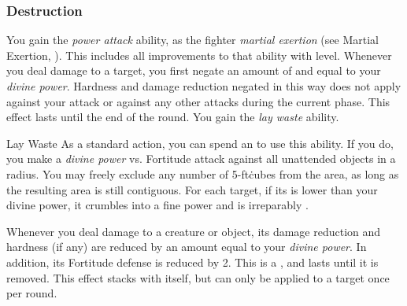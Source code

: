         \subsubsection{Destruction}
             You gain the \textit{power attack} ability, as the fighter \textit{martial exertion} (see Martial Exertion, ).
            This includes all improvements to that ability with level.
             Whenever you deal damage to a target, you first negate an amount of  and  equal to your \textit{divine power}.
            Hardness and damage reduction negated in this way does not apply against your attack or against any other attacks during the current phase.
            This effect lasts until the end of the round.
             You gain the \textit{lay waste} ability.
            \begin{ability}{Lay Waste}
                As a standard action, you can spend an  to use this ability.
                If you do, you make a \textit{divine power} vs. Fortitude attack against all unattended objects in a \arealarge radius.
                You may freely exclude any number of 5-ft\. cubes from the area, as long as the resulting area is still contiguous.
                \hit For each target, if its  is lower than your divine power, it crumbles into a fine power and is irreparably .
            \end{ability}
             Whenever you deal damage to a creature or object, its damage reduction and hardness (if any) are reduced by an amount equal to your \textit{divine power}.
            In addition, its Fortitude defense is reduced by 2.
            This is a , and lasts until it is removed.
            This effect stacks with itself, but can only be applied to a target once per round.

